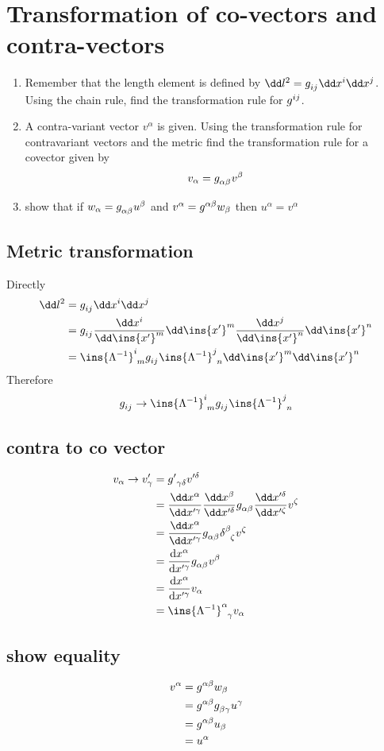 \clearpage
\section{Transformation of co-vectors and contra-vectors}
\begin{colbox}
	\begin{enumerate}
		\item Remember that the length element is defined by \(\dd l ^2 = g\indices{_{ij}}\dd x^i \dd x^j\). Using the chain rule, find the transformation rule for \(g\indices{^{ij}}\).
		\item A contra-variant vector \(v^\alpha\) is given. Using the transformation rule for contravariant vectors and the metric find the transformation rule for a covector given by \begin{equation}
			v_\alpha = g\indices{_{\alpha\beta}}v^\beta
		\end{equation}
		\item show that if \(w_\alpha = g\indices{_{\alpha\beta}}u^\beta\) and \(v^\alpha = g\indices{^\alpha^\beta}w_\beta\) then \(u^\alpha = v^\alpha\)
	\end{enumerate}
\end{colbox}
\subsection{Metric transformation}
Directly
\begin{align}
	\dd l^2 &= g\indices{_{ij}}\dd x^i \dd x^j \\
	&= g\indices{_{ij}}\frac{\dd x^i}{\dd \ins{x'}^m}\dd \ins{x'}^m \frac{\dd x^j}{\dd \ins{x'}^n}\dd \ins{x'}^n \\
	&= \ins{\Lambda^{-1}}\indices{^i_m}g\indices{_i_j}\ins{\Lambda^{-1}}\indices{^j_n}\dd \ins{x'}^m \dd \ins{x'}^n
\end{align}
Therefore
\begin{equation}
	g\indices{_i_j} \rightarrow \ins{\Lambda^{-1}}\indices{^i_m}g\indices{_i_j}\ins{\Lambda^{-1}}\indices{^j_n}
\end{equation}
\subsection{contra to co vector}
\begin{align}
	v_\alpha \rightarrow v'_\gamma &= {g'}\indices{_\gamma_\delta}v'^\delta\\
	&= \frac{\dd x^\alpha}{\dd x'^\gamma}\frac{\dd x^\beta}{\dd x'^\delta}g\indices{_\alpha_\beta}\frac{\dd x'^\delta}{\dd x'^\zeta}v^\zeta\\
	&= \frac{\dd x^\alpha}{\dd x'^\gamma}g\indices{_\alpha_\beta}\delta\indices{^\beta_\zeta}v^\zeta \\
	&= \diff{x^\alpha}{x'^\gamma}g\indices{_{\alpha\beta}}v^\beta\\
	&= \diff{x^\alpha}{x'^\gamma} v_\alpha\\
	&= \ins{\Lambda^{-1}}\indices{^\alpha_\gamma}v_\alpha
\end{align}
\subsection{show equality}
\begin{align}
	v^\alpha &= g\indices{^{\alpha\beta}}w_\beta \\
	&= g\indices{^{\alpha\beta}}g\indices{_{\beta\gamma}}u^\gamma\\
	&= g\indices{^{\alpha\beta}}u_\beta\\
	&= u^\alpha
\end{align}